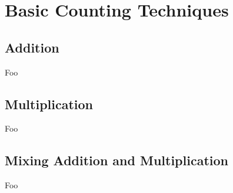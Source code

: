 \section{Basic Counting Techniques}

\subsection{Addition}

Foo

\subsection{Multiplication}

Foo

\subsection{Mixing Addition and Multiplication}

Foo

